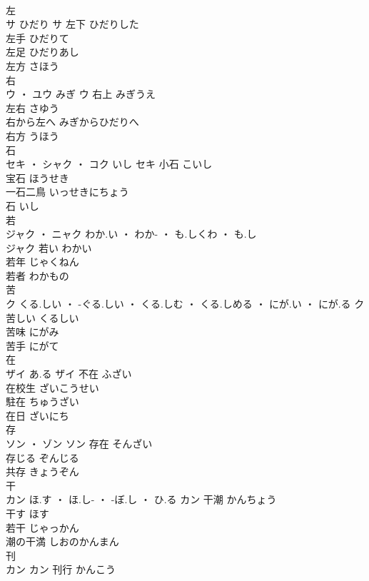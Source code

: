 \documentclass[8pt]{extreport}
\begin{document}
\begin{CJK}{UTF8}{min}
\\	左	
\\	サ	ひだり	サ	左下	ひだりした	
\\	左手	ひだりて	
\\	左足	ひだりあし	
\\	左方	さほう	
\\	右	
\\	ウ ・ ユウ	みぎ	ウ	右上	みぎうえ	
\\	左右	さゆう	
\\	右から左へ	みぎからひだりへ	
\\	右方	うほう	
\\	石	
\\	セキ ・ シャク ・ コク	いし	セキ	小石	こいし	
\\	宝石	ほうせき	
\\	一石二鳥	いっせきにちょう	
\\	石	いし	
\\	若	
\\	ジャク ・ ニャク	わか.い ・ わか- ・ も.しくわ ・ も.し
\\	ジャク	若い	わかい	
\\	若年	じゃくねん	
\\	若者	わかもの	
\\	苦	
\\	ク	くる.しい ・ -ぐる.しい ・ くる.しむ ・ くる.しめる ・ にが.い ・ にが.る	ク	苦しい	くるしい	
\\	苦味	にがみ	
\\	苦手	にがて	
\\	在	
\\	ザイ	あ.る	ザイ	不在	ふざい	
\\	在校生	ざいこうせい	
\\	駐在	ちゅうざい	
\\	在日	ざいにち	
\\	存	
\\	ソン ・ ゾン		ソン	存在	そんざい	
\\	存じる	ぞんじる	
\\	共存	きょうぞん	
\\	干	
\\	カン	ほ.す ・ ほ.し- ・ -ぼ.し ・ ひ.る	カン	干潮	かんちょう	
\\	干す	ほす	
\\	若干	じゃっかん	
\\	潮の干満	しおのかんまん	
\\	刊	
\\	カン		カン	刊行	かんこう	

\end{CJK}
\end{document}

